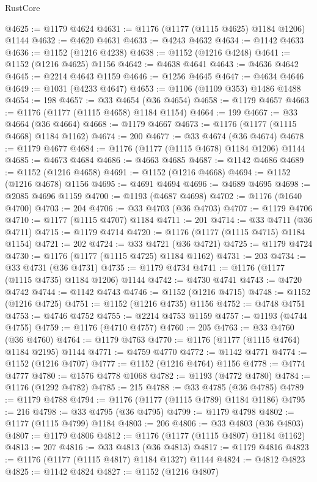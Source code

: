 \begin{lexlean}{RustCore}
\begin{coremodule}
@4625 := @1179 @4624
@4631 := @1176 (@1177 (@1115 @4625) @1184 @1206) @1144
@4632 := @4620 @4631
@4633 := @4243 @4632
@4634 := @1142 @4633
@4636 := @1152 (@1216 @4238)
@4638 := @1152 (@1216 @4248)
@4641 := @1152 (@1216 @4625) @1156
@4642 := @4638 @4641
@4643 := @4636 @4642
@4645 := @2214 @4643 @1159
@4646 := @1256 @4645
@4647 := @4634 @4646
@4649 := @1031 (@4233 @4647)
@4653 := @1106 (@1109 @353) @1486 @1488
@4654 := 198
@4657 := @33 @4654 (@36 @4654)
@4658 := @1179 @4657
@4663 := @1176 (@1177 (@1115 @4658) @1184 @1154)
@4664 := 199
@4667 := @33 @4664 (@36 @4664)
@4668 := @1179 @4667
@4673 := @1176 (@1177 (@1115 @4668) @1184 @1162)
@4674 := 200
@4677 := @33 @4674 (@36 @4674)
@4678 := @1179 @4677
@4684 := @1176 (@1177 (@1115 @4678) @1184 @1206) @1144
@4685 := @4673 @4684
@4686 := @4663 @4685
@4687 := @1142 @4686
@4689 := @1152 (@1216 @4658)
@4691 := @1152 (@1216 @4668)
@4694 := @1152 (@1216 @4678) @1156
@4695 := @4691 @4694
@4696 := @4689 @4695
@4698 := @2085 @4696 @1159
@4700 := @1193 (@4687 @4698)
@4702 := @1176 (@1640 @4700)
@4703 := 204
@4706 := @33 @4703 (@36 @4703)
@4707 := @1179 @4706
@4710 := @1177 (@1115 @4707) @1184
@4711 := 201
@4714 := @33 @4711 (@36 @4711)
@4715 := @1179 @4714
@4720 := @1176 (@1177 (@1115 @4715) @1184 @1154)
@4721 := 202
@4724 := @33 @4721 (@36 @4721)
@4725 := @1179 @4724
@4730 := @1176 (@1177 (@1115 @4725) @1184 @1162)
@4731 := 203
@4734 := @33 @4731 (@36 @4731)
@4735 := @1179 @4734
@4741 := @1176 (@1177 (@1115 @4735) @1184 @1206) @1144
@4742 := @4730 @4741
@4743 := @4720 @4742
@4744 := @1142 @4743
@4746 := @1152 (@1216 @4715)
@4748 := @1152 (@1216 @4725)
@4751 := @1152 (@1216 @4735) @1156
@4752 := @4748 @4751
@4753 := @4746 @4752
@4755 := @2214 @4753 @1159
@4757 := @1193 (@4744 @4755)
@4759 := @1176 (@4710 @4757)
@4760 := 205
@4763 := @33 @4760 (@36 @4760)
@4764 := @1179 @4763
@4770 := @1176 (@1177 (@1115 @4764) @1184 @2195) @1144
@4771 := @4759 @4770
@4772 := @1142 @4771
@4774 := @1152 (@1216 @4707)
@4777 := @1152 (@1216 @4764) @1156
@4778 := @4774 @4777
@4780 := @1576 @4778 @1068
@4782 := @1193 (@4772 @4780)
@4784 := @1176 (@1292 @4782)
@4785 := 215
@4788 := @33 @4785 (@36 @4785)
@4789 := @1179 @4788
@4794 := @1176 (@1177 (@1115 @4789) @1184 @1186)
@4795 := 216
@4798 := @33 @4795 (@36 @4795)
@4799 := @1179 @4798
@4802 := @1177 (@1115 @4799) @1184
@4803 := 206
@4806 := @33 @4803 (@36 @4803)
@4807 := @1179 @4806
@4812 := @1176 (@1177 (@1115 @4807) @1184 @1162)
@4813 := 207
@4816 := @33 @4813 (@36 @4813)
@4817 := @1179 @4816
@4823 := @1176 (@1177 (@1115 @4817) @1184 @1327) @1144
@4824 := @4812 @4823
@4825 := @1142 @4824
@4827 := @1152 (@1216 @4807)

\end{coremodule}
\end{lexlean}
